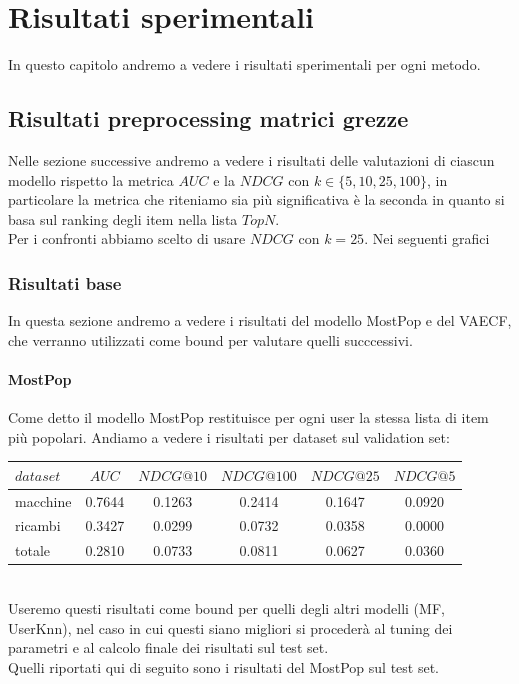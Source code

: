 \hypertarget{(chap:capitolo6)}{}
\chapter{Risultati sperimentali}
In questo capitolo andremo a vedere i risultati sperimentali per ogni metodo.
\section{Risultati preprocessing matrici grezze}
Nelle sezione successive andremo a vedere i risultati delle valutazioni di ciascun modello rispetto la metrica $AUC$ e la $NDCG$ con $k\in \{5, 10, 25, 100\}$, in particolare la metrica che riteniamo sia più significativa è la seconda in quanto si basa sul ranking degli item nella lista $TopN$. \\
Per i confronti abbiamo scelto di usare $NDCG$ con $k=25$. Nei seguenti grafici

\subsection{Risultati base}
In questa sezione andremo a vedere i risultati del modello MostPop e del VAECF, che verranno utilizzati come bound per valutare quelli succcessivi. 

\subsubsection{MostPop}
Come detto il modello MostPop restituisce per ogni user la stessa lista di item più popolari.
Andiamo a vedere i risultati per dataset sul validation set:\\

\begin{tabular}{|l|c|cccc|}
    \toprule
    $dataset$ &    $AUC$ &  $NDCG@10$ & $NDCG@100$  & $NDCG@25$ & $NDCG@5$  \\
    \midrule
    macchine & 0.7644 & 0.1263 &   0.2414 &  0.1647 & 0.0920 \\
    ricambi  & 0.3427 &  0.0299 &   0.0732 &  0.0358 & 0.0000 \\
    totale  & 0.2810 &  0.0733 &   0.0811 &  0.0627 & 0.0360 \\

\bottomrule
\end{tabular}\\

Useremo questi risultati come bound per quelli degli altri modelli (MF, UserKnn), nel caso in cui questi siano migliori si procederà al tuning dei parametri e al calcolo finale dei risultati sul test set.\\
Quelli riportati qui di seguito sono i risultati del MostPop sul test set.\\

